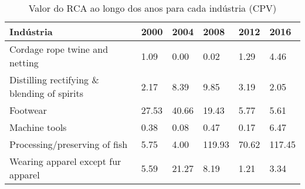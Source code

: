 \begin{table}
\centering
\caption{Valor do RCA ao longo dos anos para cada indústria (CPV)}
\begin{tabular}{p{6cm}p{1.5cm}p{1.5cm}p{1.5cm}p{1.5cm}p{1.5cm}}
\toprule
                                  Indústria &  2000 &  2004 &   2008 &  2012 &   2016 \\
\midrule
             Cordage rope twine and netting &  1.09 &  0.00 &   0.02 &  1.29 &   4.46 \\
Distilling rectifying \& blending of spirits &  2.17 &  8.39 &   9.85 &  3.19 &   2.05 \\
                                   Footwear & 27.53 & 40.66 &  19.43 &  5.77 &   5.61 \\
                              Machine tools &  0.38 &  0.08 &   0.47 &  0.17 &   6.47 \\
              Processing/preserving of fish &  5.75 &  4.00 & 119.93 & 70.62 & 117.45 \\
         Wearing apparel except fur apparel &  5.59 & 21.27 &   8.19 &  1.21 &   3.34 \\
\bottomrule
\end{tabular}
\end{table}
